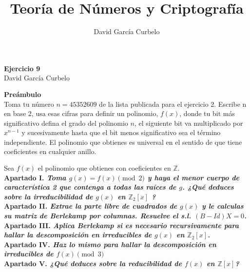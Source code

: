 \documentclass[fleqn]{article}
\author{David García Curbelo}
\title{Teoría de Números y Criptografía}
\def\Z{\mathds{Z}}
\begin{document}
    \begin{center}
        \LARGE{\textbf{Ejercicio 9}} \\
        \Large{David García Curbelo} \\
    \end{center}

    \vspace{1cm}

    \textbf{Preámbulo} \\
    Toma tu número $n=45352609$ de la lista publicada para el ejercicio 2.
    Escribe n en base 2, usa esas cifras para definir un polinomio, $f(x)$, donde tu bit más significativo
    defina el grado del polinomio $n$, el siguiente bit va multiplicado por $x^{n-1}$ y sucesivamente hasta 
    que el bit menos significativo sea el término independiente. El polinomio que obtienes es universal en el
    sentido de que tiene coeficientes en cualquier anillo.

    \newpage
    Sea $f(x)$ el polinomio que obtienes con coeficientes en $\Z$.\\ 

    \textbf{Apartado I. \textit{Toma $g(x) = f(x) \pmod{2}$ y haya el menor cuerpo de característica 2 que contenga
                                a todas las raíces de $g$. ¿Qué deduces sobre la irreducibilidad de $g(x)$ en $\Z_2[x]$ ?}}\\
    

    \newpage
    \textbf{Apartado II. \textit{Extrae la parte libre de cuadrados de $g(x)$ y le calculas su matriz de Berlekamp por
                                columnas. Resuelve el s.l. $(B - Id)X = 0$.}}\\

    \newpage
    \textbf{Apartado III. \textit{Aplica Berlekamp si es necesario recursivamente para hallar la descomposición en irreducibles de $g(x)$ en $\Z_2[x]$.}} \\


    \newpage
    \textbf{Apartado IV. \textit{Haz lo mismo para hallar la descomposición en irreducibles de $f(x) \pmod{3}$}}\\
    \newpage
    \textbf{Apartado V. \textit{¿Qué deduces sobre la reducibilidad de $f(x)$ en $\Z[x]$?}}\\
\end{document}
